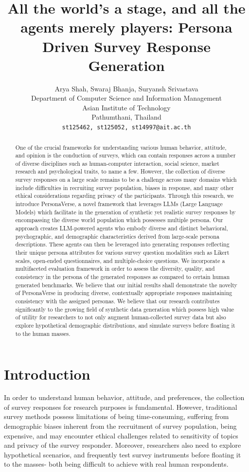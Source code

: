 \documentclass[11pt]{article}
\title{All the world's a stage, and all the agents merely players: Persona Driven Survey Response Generation}
\author{Arya Shah, Swaraj Bhanja, Suryansh Srivastava \\
         Department of Computer Science and Information Management\\ Asian Institute of Technology \\ Pathumthani, Thailand \\ \texttt{{{st125462, st125052, st14997}@ait.ac.th}}}
\begin{document}
\maketitle
\begin{abstract}
One of the crucial frameworks for understanding various human behavior, attitude, and opinion is the conduction of surveys, which can contain responses across a number of diverse disciplines such as human-computer interaction, social science, market research and psychological traits, to name a few. However, the collection of diverse survey responses on a large scale remains to be a challenge across many domains which include difficulties in recruiting survey population, biases in response, and many other ethical considerations regarding privacy of the participants. Through this research, we introduce PersonaVerse, a novel framework that leverages LLMs (Large Language Models) which facilitate in the generation of synthetic yet realistic survey responses by encompassing the diverse world population which possesses multiple persona. Our approach creates LLM-powered agents who embody diverse and distinct behavioral, psychographic, and demographic characteristics derived from large-scale persona descriptions. These agents can then be leveraged into generating responses reflecting their unique persona attributes for various survey question modalities such as  Likert scales, open-ended questionnaires, and multiple-choice questions. We incorporate a multifaceted evaluation framework in order to assess the diversity, quality, and consistency in the persona of the generated responses as compared to certain human generated benchmarks. We believe that our initial results shall demonstrate the novelty of PersonaVerse in producing diverse, contextually appropriate responses maintaining consistency with the assigned personas. We believe that our research contributes significantly to the growing field of synthetic data generation which possess high value of utility for researchers to not only augment human-collected survey data but also explore hypothetical demographic distributions, and simulate surveys before floating it to the human masses.
\end{abstract}

\section{Introduction}

In order to understand human behavior,  attitude, and preferences, the collection of survey responses for research purposes is fundamental. However, traditional survey methods possess limitations of being time-consuming, suffering from demographic biases inherent from the recruitment of survey population, being expensive, and may encounter ethical challenges related to sensitivity of topics and privacy of the survey responder. Moreover, researchers also need to explore hypothetical scenarios, and frequently test survey instruments before floating it to the masses- both being difficult to achieve with real human respondents.
\end{document}
